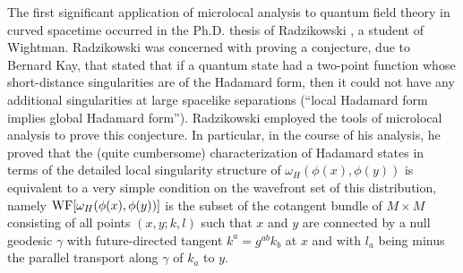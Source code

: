 The first significant application of microlocal analysis to quantum
field theory in curved spacetime occurred in the Ph.D. thesis of
Radzikowski \cite{r}, a student of Wightman. Radzikowski was concerned
with proving a conjecture, due to Bernard Kay, that stated that if a
quantum state had a two-point function whose short-distance
singularities are of the Hadamard form, then it could not have any
additional singularities at large spacelike separations (``local
Hadamard form implies global Hadamard form''). Radzikowski employed
the tools of microlocal analysis to prove this
conjecture.  In particular, in the course of his analysis, he proved
that the (quite cumbersome) characterization of Hadamard states in
terms of the detailed local singularity structure of $\omega_H
(\phi(x), \phi(y))$ is equivalent to a very simple condition on the
wavefront set of this distribution, namely ${\rm WF} [\omega_H
(\phi(x), \phi(y))]$ is the subset of the cotangent bundle of $M
\times M$ consisting of all points $(x,y;k,l)$ such that $x$ and $y$
are connected by a null geodesic $\gamma$ with future-directed tangent
$k^a = g^{ab} k_b$ at $x$ and with $l_a$ being minus the parallel
transport along $\gamma$ of $k_a$ to $y$.


